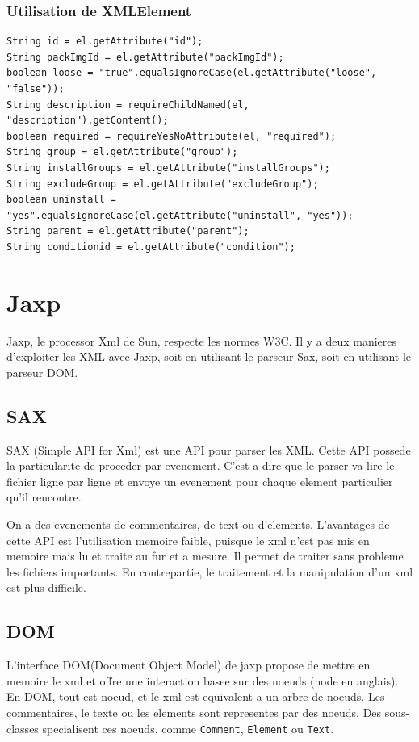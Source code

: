 \subsubsection{Utilisation de XMLElement}
\begin{lstlisting}
String id = el.getAttribute("id");
String packImgId = el.getAttribute("packImgId");
boolean loose = "true".equalsIgnoreCase(el.getAttribute("loose", "false"));
String description = requireChildNamed(el, "description").getContent();
boolean required = requireYesNoAttribute(el, "required");
String group = el.getAttribute("group");
String installGroups = el.getAttribute("installGroups");
String excludeGroup = el.getAttribute("excludeGroup");
boolean uninstall = "yes".equalsIgnoreCase(el.getAttribute("uninstall", "yes"));
String parent = el.getAttribute("parent");
String conditionid = el.getAttribute("condition");
\end{lstlisting}
\section{Jaxp}
Jaxp, le processor Xml de Sun, respecte les normes W3C. Il y a deux manieres d'exploiter les XML avec Jaxp, soit en utilisant le parseur Sax, soit en utilisant le parseur DOM.
\subsection{SAX}
SAX (Simple API for Xml) est une API pour parser les XML. Cette API possede la particularite de proceder par evenement. C'est a dire que le parser va lire le fichier ligne par ligne et envoye un evenement pour chaque element particulier qu'il rencontre. 

On a des evenements de commentaires, de text ou d'elements. L'avantages de cette API est l'utilisation memoire faible, puisque le xml n'est pas mis en memoire mais lu et traite au fur et a mesure. Il permet de traiter sans probleme les fichiers importants. En contrepartie, le traitement et la manipulation d'un xml est plus difficile.
\subsection{DOM}
L'interface DOM(Document Object Model) de jaxp propose de mettre en memoire le xml et offre une interaction basee sur des noeuds (node en anglais). En DOM, tout est noeud, et le xml est equivalent a un arbre de noeuds. Les commentaires, le texte ou les elements sont representes par des noeuds. Des sous-classes specialisent ces noeuds. comme \verb|Comment|, \verb|Element| ou \verb|Text|.

